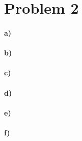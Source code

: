 \documentclass[12pt]{article}
\begin{document}
\section*{Problem 2}

\paragraph{a)}

\paragraph{b)}

\paragraph{c)}

\paragraph{d)}

\paragraph{e)}

\paragraph{f)}
\end{document}
